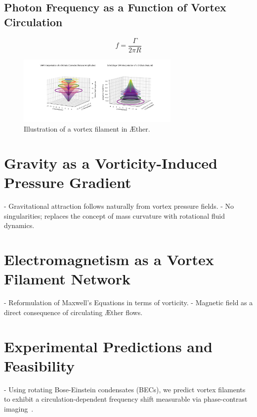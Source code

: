 \documentclass[a4paper,10pt]{article}
\begin{document}
    \subsection{Photon Frequency as a Function of Vortex Circulation}\label{subsec:photon-frequency-as-a-function-of-vortex-circulation}
    \begin{equation}
        f = \frac{\Gamma}{2\pi R}\label{eq:equation3}
    \end{equation}


    \begin{figure}[h]
        \centering
        \includegraphics[width=0.7\textwidth]{vortex_diagram}
        \caption{Illustration of a vortex filament in Æther.}
        \label{fig:vortex}
    \end{figure}


    \section{Gravity as a Vorticity-Induced Pressure Gradient}\label{sec:gravity-as-a-vorticity-induced-pressure-gradient}
    - Gravitational attraction follows naturally from vortex pressure fields.
    - No singularities; replaces the concept of mass curvature with rotational fluid dynamics.

    \section{Electromagnetism as a Vortex Filament Network}\label{sec:electromagnetism-as-a-vortex-filament-network}
    - Reformulation of Maxwell’s Equations in terms of vorticity.
    - Magnetic field as a direct consequence of circulating \AE ther flows.

    \section{Experimental Predictions and Feasibility}\label{sec:experimental-predictions-and-feasibility}
    - Using rotating Bose-Einstein condensates (BECs), we predict vortex filaments to exhibit a circulation-dependent frequency shift measurable via phase-contrast imaging~\cite{kleckner2013}.
\end{document}
